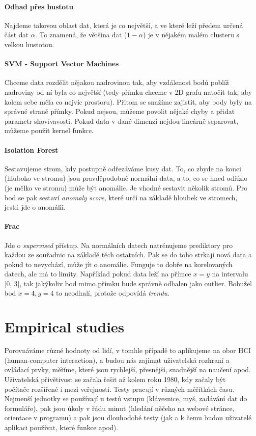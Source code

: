 \documentclass[10pt,a4paper]{article}
\begin{document}
\paragraph{Odhad přes hustotu} Najdeme takovou oblast dat, která je co největší, a ve které leží předem určená část dat $\alpha$. To znamená, že většina dat ($1 - \alpha$) je v nějakém malém clusteru s velkou hustotou.

\paragraph{SVM - Support Vector Machines} Chceme data rozdělit nějakou nadrovinou tak, aby vzdálenost bodů poblíž nadroviny od ní byla co největší (tedy přímku chceme v 2D grafu natočit tak, aby kolem sebe měla co nejvíc prostoru). Přitom se snažíme zajistit, aby body byly na správné straně přímky. Pokud nejsou, můžeme povolit nějaké chyby a přidat parametr shovívavosti. Pokud data v dané dimenzi nejdou lineárně separovat, můžeme použít kernel funkce.

\paragraph{Isolation Forest} Sestavujeme strom, kdy postupně odřezáváme kusy dat. To, co zbyde na konci (hluboko ve stromu) jsou pravděpodobně normální data, a to, co se hned odřízlo (je mělko ve stromu) může být anomálie. Je vhodné sestavit několik stromů. Pro bod se pak sestaví \textit{anomaly score}, které určí na základě hloubek ve stromech, jestli jde o anomálii.

\paragraph{Frac} Jde o \textit{supervised} přístup. Na normálních datech natrénujeme prediktory pro každou ze souřadnic na základě těch ostatních. Pak se do toho strkají nová data a pokud to nevychází, může jít o anomálie. Funguje to dobře na korelovaných datech, ale má to limity. Například pokud data leží na přímce $x=y$ na intervalu [0, 3], tak jakýkoliv bod mimo přímku bude správně odhalen jako outlier. Bohužel bod $x=4, y=4$ to neodhalí, protože odpovídá \textit{trendu}.


\section{Empirical studies}

Porovnáváme různé hodnoty od lidí, v tomhle případě to aplikujeme na obor HCI (human-computer interaction), a budou nás zajímat uživatelská rozhraní a ovládací prvky, měříme, které jsou rychlejší, přesnější, snadnější na naučení apod. Uživatelská přívětivost se začala řešit až kolem roku 1980, kdy začaly být počítače rozšířené i mezi veřejností. Testy pracují v různých měřítkách času. Nejmenší jednotky se používají u testů vstupu (klávesnice, myš, zadávání dat do formuláře), pak jsou úkoly v řádu minut   (hledání něčeho na webové stránce, orientace v programu) a pak jsou dlouhodobé testy (jak a k čemu budou uživatelé aplikaci používat, které funkce apod). 
\end{document}
